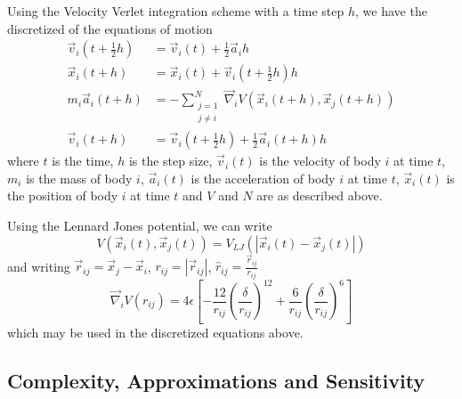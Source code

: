 Using the Velocity Verlet integration scheme with a time step $h$,
we have the discretized of the equations of motion
\begin{align}
    \vec{v}_i(t + \tfrac{1}{2} h) &=
        \vec{v}_i(t) + \tfrac{1}{2}\vec{a}_i h
    \\
    \vec{x}_i(t + h) &=
        \vec{x}_i(t) + \vec{v}_i(t + \tfrac{1}{2} h) h
    \\
    m_i \vec{a}_i(t + h) &=
        - \sum_{\substack{j=1\\j\ne{}i}}^N
            \vec{\nabla}_i V(\vec{x}_i(t+h), \vec{x}_j(t+h))
    \\
    \vec{v}_i(t+h) &=
        \vec{v}_i(t + \tfrac{1}{2} h) + \tfrac{1}{2} \vec{a}_i(t + h) h
\end  {align}
where $t$ is the time,
$h$ is the step size,
$\vec{v}_i(t)$ is the velocity of body $i$ at time $t$,
$m_i$ is the mass of body $i$,
$\vec{a}_i(t)$ is the acceleration of body $i$ at time $t$,
$\vec{x}_i(t)$ is the position of body $i$ at time $t$ and
$V$ and $N$ are as described above.

Using the Lennard Jones potential, we can write
\begin{equation}
    V(\vec{x}_i(t), \vec{x}_j(t)) = V_{LJ}(|\vec{x}_i(t) - \vec{x}_j(t)|)
\end  {equation}
and writing $\vec{r}_{ij} = \vec{x}_j - \vec{x}_i$,
$r_{ij} = |\vec{r}_{ij}|$, $\hat{r}_{ij} = \frac{\vec{r}_{ij}}{r_{ij}}$
\begin{equation}
    \vec{\nabla}_i V(r_{ij}) = 4\epsilon \left[
        - \frac{12}{r_{ij}} \left( \frac{\delta}{r_{ij}} \right)^{12}
        + \frac{6}{r_{ij}} \left( \frac{\delta}{r_{ij}} \right)^{6}
    \right]
\end  {equation}
which may be used in the discretized equations above.


%
%
%


\subsection{Complexity, Approximations and Sensitivity}

